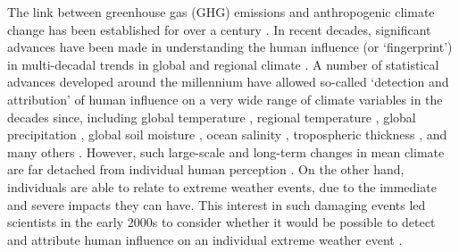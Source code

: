   The link between greenhouse gas (GHG) emissions and anthropogenic climate change has been established for over a century \citep{arrhenius_influence_1896}. In recent decades, significant advances have been made in understanding the human influence (or `fingerprint') in multi-decadal trends in global and regional climate \citep{bindoff_detection_2013,masson-delmotte_human_2021,stott_detection_2021}. A number of statistical advances developed around the millennium \citep{hasselmann_optimal_1993,hasselmann_multi-pattern_1997,allen_checking_1999,allen_estimating_2003,stott_estimating_2003} have allowed so-called `detection and attribution' of human influence on a very wide range of climate variables in the decades since, including global temperature \citep{hegerl_multi-fingerprint_1997,stott_attribution_2001,gillett_constraining_2021}, regional temperature \citep{gillett_attribution_2008}, global precipitation \citep{bonfils_human_2020}, global soil moisture \citep{gu_attribution_2019}, ocean salinity \citep{stott_detection_2008}, tropospheric thickness \citep{christidis_changes_2015}, and many others \citep{masson-delmotte_human_2021}. However, such large-scale and long-term changes in mean climate are far detached from individual human perception \citep{pahl_perceptions_2014}. On the other hand, individuals are able to relate to extreme weather events, due to the immediate and severe impacts they can have. This interest in such damaging events led scientists in the early 2000s to consider whether it would be possible to detect and attribute human influence on an individual extreme weather event \citep{allen_liability_2003}.

